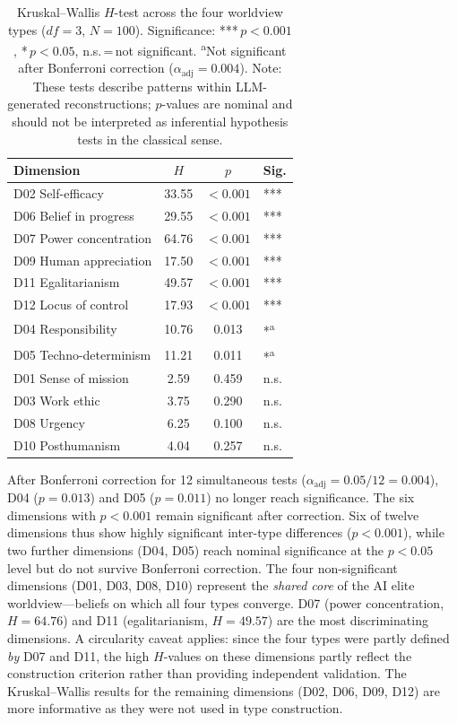 \documentclass[12pt,a4paper]{article}
\begin{document}
\begin{table}[htbp]
  \centering
  \caption{Kruskal--Wallis $H$-test across the four worldview types ($df = 3$, $N = 100$). Significance: {*}{*}{*}\,$p < 0.001$, {*}\,$p < 0.05$, n.s.\,=\,not significant. \textsuperscript{a}Not significant after Bonferroni correction ($\alpha_{\mathrm{adj}} = 0.004$). Note: These tests describe patterns within LLM-generated reconstructions; $p$-values are nominal and should not be interpreted as inferential hypothesis tests in the classical sense.}
  \label{tab:kruskal}
  \footnotesize
  \begin{tabular}{l c c l}
    \toprule
    \textbf{Dimension} & $H$ & $p$ & \textbf{Sig.} \\
    \midrule
    D02 Self-efficacy & 33.55 & $< 0.001$ & {*}{*}{*} \\
    D06 Belief in progress & 29.55 & $< 0.001$ & {*}{*}{*} \\
    D07 Power concentration & 64.76 & $< 0.001$ & {*}{*}{*} \\
    D09 Human appreciation & 17.50 & $< 0.001$ & {*}{*}{*} \\
    D11 Egalitarianism & 49.57 & $< 0.001$ & {*}{*}{*} \\
    D12 Locus of control & 17.93 & $< 0.001$ & {*}{*}{*} \\
    \midrule
    D04 Responsibility & 10.76 & 0.013 & {*}\textsuperscript{a} \\
    D05 Techno-determinism & 11.21 & 0.011 & {*}\textsuperscript{a} \\
    \midrule
    D01 Sense of mission & 2.59 & 0.459 & n.s. \\
    D03 Work ethic & 3.75 & 0.290 & n.s. \\
    D08 Urgency & 6.25 & 0.100 & n.s. \\
    D10 Posthumanism & 4.04 & 0.257 & n.s. \\
    \bottomrule
  \end{tabular}
\end{table}

After Bonferroni correction for 12 simultaneous tests ($\alpha_{\mathrm{adj}} = 0.05/12 = 0.004$), D04 ($p = 0.013$) and D05 ($p = 0.011$) no longer reach significance. The six dimensions with $p < 0.001$ remain significant after correction. Six of twelve dimensions thus show highly significant inter-type differences ($p < 0.001$), while two further dimensions (D04, D05) reach nominal significance at the $p < 0.05$ level but do not survive Bonferroni correction. The four non-significant dimensions (D01, D03, D08, D10) represent the \emph{shared core} of the AI elite worldview---beliefs on which all four types converge. D07 (power concentration, $H = 64.76$) and D11 (egalitarianism, $H = 49.57$) are the most discriminating dimensions. A circularity caveat applies: since the four types were partly defined \emph{by} D07 and D11, the high $H$-values on these dimensions partly reflect the construction criterion rather than providing independent validation. The Kruskal--Wallis results for the remaining dimensions (D02, D06, D09, D12) are more informative as they were not used in type construction.
\end{document}

